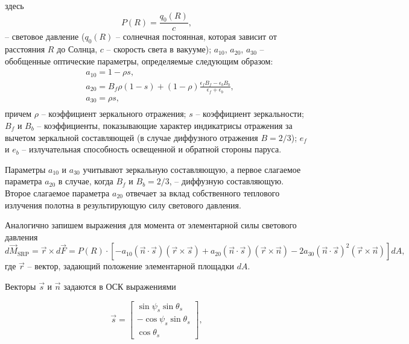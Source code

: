 здесь
\begin{equation}
  P(R) = \frac{q_0(R)}{c},
\end{equation}
-- световое давление ($q_0(R)$ -- солнечная постоянная, которая зависит от
расстояния $R$ до Солнца, $c$ -- скорость света в вакууме); $a_{10}$, $a_{20}$,
$a_{30}$ -- обобщенные оптические параметры, определяемые следующим образом:
\begin{equation}
  \begin{aligned}
    & a_{10} = 1 - \rho s, \\
    & a_{20} = B_f\rho(1 - s) + (1 - \rho)\frac{\epsilon_f B_f - \epsilon_b B_b}{\epsilon_f + \epsilon_b}, \\
    & a_{30} = \rho s, \\
  \end{aligned}
\end{equation}
причем $\rho$ -- коэффициент зеркального отражения; $s$ -- коэффициент зеркальности;
$B_f$ и $B_b$ -- коэффициенты, показывающие характер индикатрисы отражения за вычетом
зеркальной составляющей (в случае диффузного отражения $B = 2/3$); $e_f$ и $e_b$ --
излучательная способность освещенной и обратной стороны паруса.\par
  Параметры $a_{10}$ и $a_{30}$ учитывают зеркальную составляющую, а первое слагаемое
параметра $a_{20}$ в случае, когда $B_f$ и $B_b = 2/3$, -- диффузную составляющую.
Второе слагаемое параметра $a_{20}$ отвечает за вклад собственного теплового излучения
полотна в результирующую силу светового давления.\par
  Аналогично запишем выражения для момента от элементарной силы светового давления
\begin{equation}
  d\vec{M}_{\text{SRP}} = \vec{r} \times d\vec{F} = P(R) \cdot \left[
    -a_{10}(\vec{n}\cdot\vec{s})(\vec{r} \times \vec{s})
    +a_{20}(\vec{n}\cdot\vec{s})(\vec{r} \times \vec{n})
    -2a_{30}(\vec{n}\cdot\vec{s})^2(\vec{r} \times \vec{n})
  \right]dA,
\end{equation}
где $\vec{r}$ -- вектор, задающий положение элементарной площадки $dA$.\par
  Векторы $\vec{s}$ и $\vec{n}$ задаются в ОСК выражениями\par
\begin{equation} \label{eq:SunVector}
  \vec{s} = \begin{bmatrix}
     \sin\psi_s\sin\theta_s \\
    -\cos\psi_s\sin\theta_s \\
     \cos\theta_s
  \end{bmatrix},
\end{equation}
